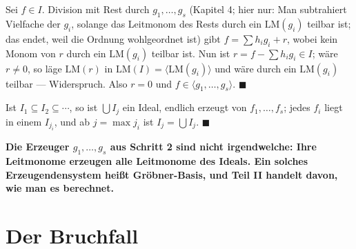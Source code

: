 \begin{merksatz}
Sei $f\in I$. Division mit Rest durch $g_1, \ldots, g_s$ (Kapitel 4; hier nur: Man subtrahiert Vielfache der $g_i$, solange das Leitmonom des Rests durch ein $\mathrm{LM}(g_i)$ teilbar ist; das endet, weil die Ordnung wohlgeordnet ist) gibt $f = \sum h_ig_i + r$, wobei kein Monom von $r$ durch ein $\mathrm{LM}(g_i)$ teilbar ist. Nun ist $r = f - \sum h_ig_i\in I$; wäre $r\ne0$, so läge $\mathrm{LM}(r)$ in $\mathrm{LM}(I) = \langle\mathrm{LM}(g_i)\rangle$ und wäre durch ein $\mathrm{LM}(g_i)$ teilbar --- Widerspruch. Also $r = 0$ und $f\in\langle g_1, \ldots, g_s\rangle$. $\blacksquare$

Ist $I_1\subseteq I_2\subseteq\cdots$, so ist $\bigcup I_j$ ein Ideal, endlich erzeugt von $f_1, \ldots, f_s$; jedes $f_i$ liegt in einem $I_{j_i}$, und ab $j = \max j_i$ ist $I_j = \bigcup I_j$. $\blacksquare$

\begin{center}
\begin{minipage}{0.9\textwidth}
\textbf{Die Erzeuger $g_1, \ldots, g_s$ aus Schritt 2 sind nicht irgendwelche: Ihre Leitmonome erzeugen alle Leitmonome des Ideals. Ein solches Erzeugendensystem heißt Gröbner-Basis, und Teil II handelt davon, wie man es berechnet.}
\end{minipage}
\end{center}

\begin{center}
\begin{minipage}{0.88\textwidth}
\end{minipage}
\end{center}
\end{merksatz}

\section{Der Bruchfall}

